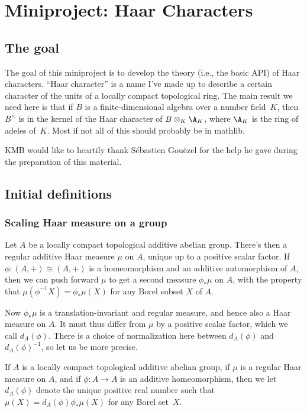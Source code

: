 \chapter{Miniproject: Haar Characters}\label{Haar_char_project}

\section{The goal}

The goal of this miniproject is to develop the theory (i.e., the basic API) of Haar characters.
``Haar character'' is a name I've made up to describe a certain character of the units of a locally
compact topological ring. The main result we need here is that if $B$ is a finite-dimensional
algebra over a number field~$K$, then $B^\times$ is in the kernel of the Haar character
of $B\otimes_K\A_K$, where $\A_K$ is the ring of adeles of~$K$. Most if not all of this
should probably be in mathlib.

KMB would like to heartily thank S\'ebastien Gou\"ezel for the help he gave during the preparation
of this material.

\section{Initial definitions}

\subsection{Scaling Haar measure on a group}

Let $A$ be a locally compact topological additive abelian group. There's then a regular additive
Haar measure $\mu$ on $A$, unique up to a positive scalar factor. If $\phi:(A,+)\cong(A,+)$ is a
homeomorphism and an additive automorphism of $A$, then we can push forward $\mu$
to get a second measure $\phi_*\mu$ on $A$, with the property that
$\mu(\phi^{-1}X)=\phi_*\mu(X)$ for any Borel subset $X$ of $A$.

Now $\phi_*\mu$ is a translation-invariant and regular measure,
and hence also a Haar measure on $A.$ It must thus differ from
$\mu$ by a positive scalar factor, which we call $d_A(\phi)$.
There is a choice of normalization here between $d_A(\phi)$
and $d_A(\phi)^{-1}$, so let us be more precise.

\begin{definition}
  \label{MeasureTheory.addEquivAddHaarChar}
  If $A$ is a locally compact topological additive abelian group,
  if $\mu$ is a regular Haar measure on $A$, and if $\phi:A\to A$ is an
  additive homeomorphism, then we let $d_A(\phi)$ denote the unique positive
  real number such that $\mu(X)=d_A(\phi)\phi_*\mu(X)$ for any Borel set~$X$.
\end{definition}

